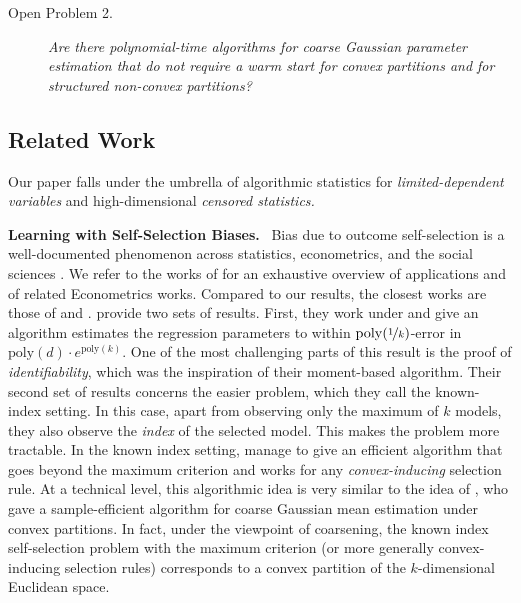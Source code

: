 \documentclass[11pt,letterpaper]{article}
\theoremstyle{plain}
\theoremstyle{definition}
\theoremstyle{remark}
\newcommand{\nfrac}[2]{\nicefrac{#1}{#2}}
\newcommand{\poly}{\mathrm{poly}}
\renewcommand{\paragraph}[1]{\medskip \noindent\textbf{#1}~}
\begin{document}
\begin{description}
    \item[Open Problem 2.] \emph{Are there polynomial-time algorithms for coarse Gaussian parameter estimation that do not require a warm start for convex partitions and for structured non-convex partitions?}
\end{description}


\subsection{Related Work}
Our paper falls under the umbrella of algorithmic statistics for 
\emph{limited-dependent variables} and high-dimensional
\emph{censored statistics.}

\paragraph{Learning with Self-Selection Biases.}  
Bias due to outcome self-selection is a
well-documented phenomenon across statistics, econometrics, and
the social sciences \cite{roy1951earnings,fair1972methods,lee1978estimation,willis1979education,olsen1982distributional,maddala1986limited,heckman1979sample}. We refer to the works of \citet{cherapanamjeri2023selfselection,cherapanamjeri2022auctionEstimation} for an exhaustive overview of applications and of related Econometrics works. Compared to our results, the closest works are those of \cite{cherapanamjeri2023selfselection} and \citet{gaitonde2024selfselection}. \cite{cherapanamjeri2023selfselection} provide two sets of results. 
First, they work under  and give an algorithm estimates the regression parameters to within $\poly(\nfrac{1}{k})$-error in $\poly(d)\cdot e^{\poly(k)}$. One of the most challenging parts of this result is the proof of \emph{identifiability}, which was the inspiration of their moment-based algorithm. Their second set of results concerns the easier problem, which they call the known-index setting. In this case, apart from observing only the maximum of $k$ models, they also observe the \emph{index} of the selected model. This makes the problem more tractable. In the known index setting, \cite{cherapanamjeri2023selfselection} manage to give an efficient algorithm that goes beyond the maximum criterion and works for any \emph{convex-inducing} selection rule. At a technical level, this algorithmic idea is very similar to the idea of \citet{fotakis2021coarse}, who gave a sample-efficient algorithm for coarse Gaussian mean estimation under convex partitions. In fact, under the viewpoint of coarsening, the known index self-selection problem with the maximum criterion (or more generally convex-inducing selection rules) corresponds to a convex partition of the $k$-dimensional Euclidean space.
\end{document}
